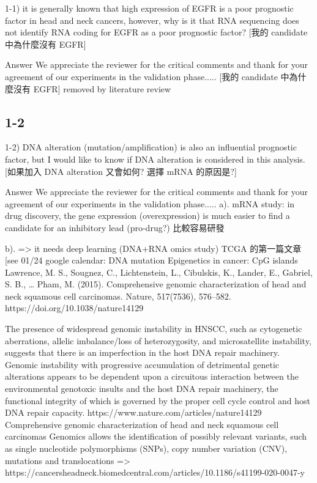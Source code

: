 \documentclass[preprint,12pt]{elsarticle}
\begin{document}
1-1) it is generally known that high expression of EGFR is a poor prognostic factor in head and neck cancers, however, why is it that RNA sequencing does not identify RNA coding for EGFR as a poor prognostic factor?
[我的 candidate 中為什麼沒有 EGFR]

Answer
We appreciate the reviewer for the critical comments and thank for your agreement of our experiments in the validation phase.....
[我的 candidate 中為什麼沒有 EGFR]
removed by literature review

\subsection{1-2}
1-2)
 DNA alteration (mutation/amplification) is also an influential prognostic factor, but I would like to know if DNA alteration is considered in this analysis.
[如果加入 DNA alteration 又會如何? 選擇 mRNA 的原因是?]

Answer
We appreciate the reviewer for the critical comments and thank for your agreement of our experiments in the validation phase.....
a). mRNA study: in drug discovery, the gene expression (overexpression) is much easier to find a candidate for an inhibitory lead (pro-drug?) 比較容易研發

b). => it needs deep learning (DNA+RNA omics study)
\cite{Lawrence2015a} TCGA 的第一篇文章
[see 01/24 google calendar: DNA mutation
Epigenetics in cancer: CpG islands
Lawrence, M. S., Sougnez, C., Lichtenstein, L., Cibulskis, K., Lander, E., Gabriel, S. B., … Pham, M. (2015). Comprehensive genomic characterization of head and neck squamous cell carcinomas. Nature, 517(7536), 576–582. https://doi.org/10.1038/nature14129

The presence of widespread genomic instability in HNSCC, such as cytogenetic aberrations, allelic imbalance/loss of heterozygosity, and microsatellite instability, suggests that there is an imperfection in the host DNA repair machinery. Genomic instability with progressive accumulation of detrimental genetic alterations appears to be dependent upon a circuitous interaction between the environmental genotoxic insults and the host DNA repair machinery, the functional integrity of which is governed by the proper cell cycle control and host DNA repair capacity.
https://www.nature.com/articles/nature14129 Comprehensive genomic characterization of head and neck squamous cell carcinomas
Genomics allows the identification of possibly relevant variants, such as single nucleotide polymorphisms (SNPs), copy number variation (CNV), mutations and translocations => https://cancersheadneck.biomedcentral.com/articles/10.1186/s41199-020-0047-y
\end{document}

